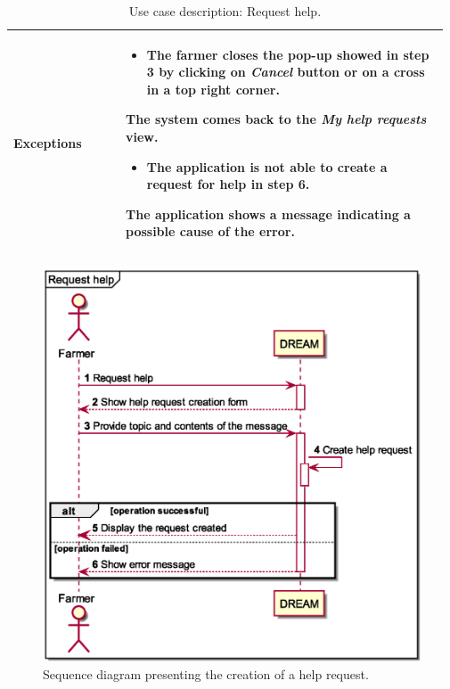 \begin{table}[H]
\begin{tabular}{@{}p{0.25\linewidth} p{0.72\linewidth}@{}}
		\textbf{Exceptions}         & \begin{itemize}[leftmargin=.4cm,noitemsep,topsep=0pt,before=\vspace{-3mm}]
		   \item The farmer closes the pop-up showed in step 3 by clicking on \textit{Cancel} button or on a  cross in a top right corner.
		\end{itemize}
	    The system comes back to the \textit{My help requests} view.
	    \begin{itemize}[leftmargin=.4cm,noitemsep,topsep=0pt]
		   \item The application is not able to create a request for help in step 6. 
		\end{itemize}
		The application shows a message indicating a possible cause of the error.\\
		\bottomrule
	\end{tabular}
	\caption{Use case description: Request help.} 
\end{table}

\begin{figure}[H]
    \centering
    \includegraphics[scale=0.6, keepaspectratio, origin=c]{diagrams/sequence/request_help}
    \caption{Sequence diagram presenting the creation of a help request.}
    \label{fig:sd_request_help}
\end{figure}

